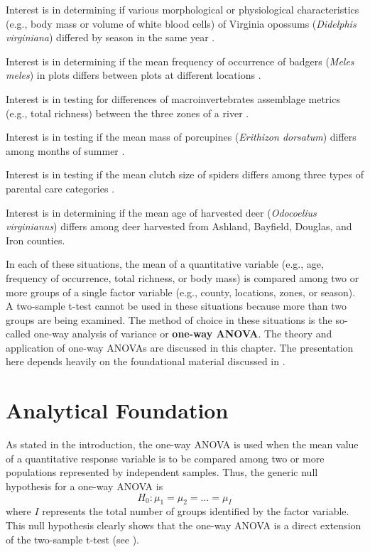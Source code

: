 \documentclass[10pt,openany]{book}\usepackage[]{graphicx}\usepackage[]{color}
\begin{document}
\begin{Itemize}
  \item Interest is in determining if various morphological or physiological characteristics (e.g., body mass or volume of white blood cells) of Virginia opossums (\emph{Didelphis virginiana}) differed by season in the same year \citep{WoodsHellgren2003}.
  \item Interest is in determining if the mean frequency of occurrence of badgers (\emph{Meles meles}) in plots differs between plots at different locations \citep{VirgosCasanovas1999}.
  \item Interest is in testing for differences of macroinvertebrates assemblage metrics (e.g., total richness) between the three zones of a river \citep{GrubbsTaylor2004}.
  \item Interest is in testing if the mean mass of porcupines (\emph{Erithizon dorsatum}) differs among months of summer \citep{SweitzerBerger1993}.
  \item Interest is in testing if the mean clutch size of spiders differs among three types of parental care categories \citep{Simpson1995}.
  \item Interest is in determining if the mean age of harvested deer (\emph{Odocoelius virginianus}) differs among deer harvested from Ashland, Bayfield, Douglas, and Iron counties.
\end{Itemize}

In each of these situations, the mean of a quantitative variable (e.g., age, frequency of occurrence, total richness, or body mass) is compared among two or more groups of a single factor variable (e.g., county, locations, zones, or season).  A two-sample t-test cannot be used in these situations because more than two groups are being examined.  The method of choice in these situations is the so-called one-way analysis of variance or \textbf{one-way ANOVA}.  The theory and application of one-way ANOVAs are discussed in this chapter.  The presentation here depends heavily on the foundational material discussed in .


\vspace{-12pt}


\section{Analytical Foundation}
As stated in the introduction, the one-way ANOVA is used when the mean value of a quantitative response variable is to be compared among two or more populations represented by independent samples.  Thus, the generic null hypothesis for a one-way ANOVA is
\[ H_{0}: \mu_{1} = \mu_{2} = \ldots = \mu_{I} \]
where $I$ represents the total number of groups identified by the factor variable.  This null hypothesis clearly shows that the one-way ANOVA is a direct extension of the two-sample t-test (see ).
\end{document}
